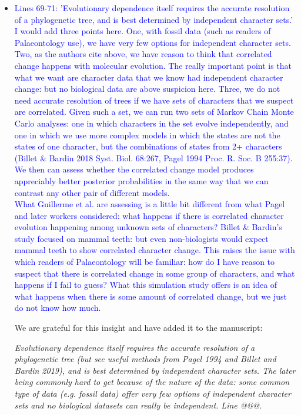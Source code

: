 \documentclass[12pt,letterpaper]{article}
\begin{document}
\begin{itemize}
\item{\textcolor{blue}{Lines 69-71: 'Evolutionary dependence itself requires the accurate resolution of a phylogenetic tree, and is best determined by independent character sets.'
\\
I would add three points here. One, with fossil data (such as readers of Palaeontology use), we have very few options for independent character sets. Two, as the authors cite above, we have reason to think that correlated change happens with molecular evolution. The really important point is that what we want are character data that we know had independent character change: but no biological data are above suspicion here. Three, we do not need accurate resolution of trees if we have sets of characters that we suspect are correlated. Given such a set, we can run two sets of Markov Chain Monte Carlo analyses: one in which characters in the set evolve independently, and one in which we use more complex models in which the states are not the states of one character, but the combinations of states from 2+ characters (Billet \& Bardin 2018 Syst. Biol. 68:267, Pagel 1994 Proc. R. Soc. B 255:37). We then can assess whether the correlated change model produces appreciably better posterior probabilities in the same way that we can contrast any other pair of different models.
\\
What Guillerme et al. are assessing is a little bit different from what Pagel and later workers considered: what happens if there is correlated character evolution happening among unknown sets of characters? Billet \& Bardin's study focused on mammal teeth: but even non-biologists would expect mammal teeth to show correlated character change. This raises the issue with which readers of Palaeontology will be familiar: how do I have reason to suspect that there is correlated change in some group of characters, and what happens if I fail to guess? What this simulation study offers is an idea of what happens when there is some amount of correlated change, but we just do not know how much.}}

We are grateful for this insight and have added it to the manuscript:

\textit{Evolutionary dependence itself requires the accurate resolution of a phylogenetic tree (but see useful methods from Pagel 1994 and Billet and Bardin 2019), and is best determined by independent character sets. The later being commonly hard to get because of the nature of the data: some common type of data (e.g. fossil data) offer very few options of independent character sets and no biological datasets can really be independent. Line @@@.}


\end{itemize}
\end{document}

